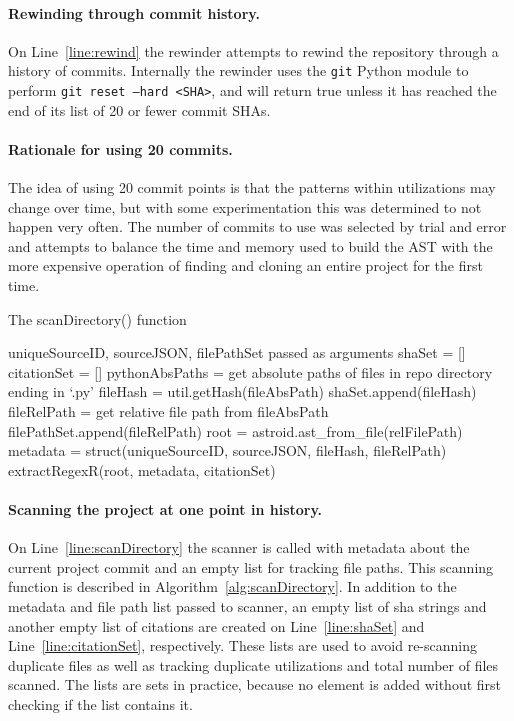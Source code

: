 \paragraph{Rewinding through commit history.} On Line~\ref{line:rewind} the rewinder attempts to rewind the repository through a history of commits.  Internally the rewinder uses the {\tt git} Python module to perform {\tt git reset --hard <SHA>}, and will return true unless it has reached the end of its list of 20 or fewer commit SHAs.

\paragraph{Rationale for using 20 commits.} The idea of using 20 commit points is that the patterns within utilizations may change over time, but with some experimentation this was determined to not happen very often.  The number of commits to use was selected by trial and error and attempts to balance the time and memory used to build the AST with the more expensive operation of finding and cloning an entire project for the first time.

\begin{algorithm}
  \caption{The scanDirectory() function}\label{alg:scanDirectory}
  \begin{algorithmic}[1]
\State uniqueSourceID, sourceJSON, filePathSet passed as arguments
\State shaSet = []\label{line:shaSet}
\State citationSet = []\label{line:citationSet}
\State pythonAbsPaths = get absolute paths of files in repo directory ending in `.py'\label{line:getAbsPaths}
\label{line:forFile}
    \State fileHash = util.getHash(fileAbsPath)\label{line:getHash}
        \State shaSet.append(fileHash)
        \State fileRelPath = get relative file path from fileAbsPath
            \State filePathSet.append(fileRelPath)\label{line:addFilePathSet}
        \EndIf
        \State root = astroid.ast\_from\_file(relFilePath)\label{line:buildAST}
        \State metadata = struct(uniqueSourceID, sourceJSON, fileHash, fileRelPath)
        \State extractRegexR(root, metadata, citationSet)\label{line:extractRegex}
    \EndIf
\EndFor
\end{algorithmic}
\end{algorithm}


\paragraph{Scanning the project at one point in history.} On Line~\ref{line:scanDirectory} the scanner is called with metadata about the current project commit and an empty list for tracking file paths.  This scanning function is described in Algorithm~\ref{alg:scanDirectory}.  In addition to the metadata and file path list passed to scanner, an empty list of sha strings and another empty list of citations are created on Line~\ref{line:shaSet} and Line~\ref{line:citationSet}, respectively.  These lists are used to avoid re-scanning duplicate files as well as tracking duplicate utilizations and total number of files scanned.  The lists are sets in practice, because no element is added without first checking if the list contains it.

